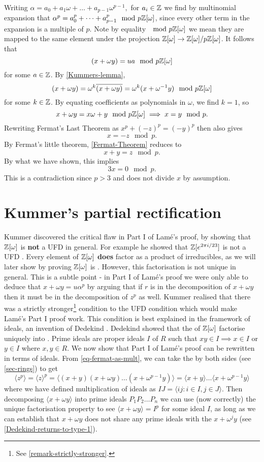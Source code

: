 Writing $\alpha=a_0+a_1\omega+\dots+a_{p-1}\omega^{p-1},$ for $a_i\in \mathbb{Z}$ we find by multinomial expansion that $\alpha^p=a_0^p+\dots+a_{p-1}^p \mod p\mathbb{Z}[\omega]$, since every other term in the expansion is a multiple of $p$. Note by equality    $\mod p\mathbb{Z}[\omega]$ we mean they are mapped to the same element under the projection $\mathbb{Z}[\omega]\rightarrow \mathbb{Z}[\omega]/p\mathbb{Z}[\omega]$. It follows that $$(x+\omega y)=ua\mod p\mathbb{Z}[\omega]$$ for some $a\in \mathbb{Z}$. By \cref{Kummers-lemma}, $$(x+\omega y)=\omega^k\overline{(x+\omega y)}=\omega^k(x+\omega^{-1}y) \mod p\mathbb{Z}[\omega]$$ for some $k\in \mathbb{Z}$. By equating coefficients as polynomials in $\omega$, we find $k=1$, so
$$x+\omega y=x\omega+y \mod p\mathbb{Z}[\omega] \implies x=y\mod p.$$
Rewriting Fermat's Last Theorem as $x^p+(-z)^p=(-y)^p$ then also gives $$x=-z\mod p.$$ By Fermat's little theorem, \cref{Fermat-Theorem} reduces to
$$x+y=z\mod p.$$
By what we have shown, this implies
$$3x=0\mod p.$$
This is a contradiction since $p> 3$ and does not divide $x$ by assumption.

\section{Kummer's partial rectification}
Kummer discovered the critical flaw in Part I of Lamé's proof, by showing that $\mathbb{Z}[\omega]$ is \textbf{not} a UFD in general. For example he showed that $\mathbb{Z}[e^{2\pi i/23}]$ is not a UFD \cite{Wright}. Every element of $\mathbb{Z}[\omega]$ \textbf{does} factor as a product of irreducibles, as we will later show by proving $\mathbb{Z}[\omega]$ is . However, this factorisation is not unique in general. This is a subtle point - in Part I of Lamé's proof we were only able to deduce that $x+\omega y=u\alpha^p$ by arguing that if $r$ is in the decomposition of $x+\omega y$ then it must be in the decomposition of $z^p$ as well. Kummer realised that there was a strictly stronger\footnote{See \cref{remark-strictly-stronger}.} condition to the UFD condition which would make Lamé's Part I proof work. This condition is best explained in the framework of ideals, an invention of Dedekind \cite{Wright}. Dedekind showed that the  of $\mathbb{Z}[\omega]$ factorise uniquely into . Prime ideals are proper ideals $I$ of $R$ such that $xy\in I\implies x\in I$ or $y\in I$ where $x,y\in R.$ We now show that Part I of Lamé's proof can be rewritten in terms of ideals. From \cref{eq-fermat-as-mult}, we can take the  by both sides (see \cref{sec-rings}) to get
\begin{equation} \langle z^p\rangle =\langle z\rangle ^p=\langle (x+y)(x+\omega y)\dots(x+\omega^{p-1}y)\rangle=\langle x+y\rangle\dots\langle x+\omega^{p-1}y\rangle
\label{eq-fermat-mult-ideals}
\end{equation}
where we have defined multiplication of ideals as $IJ=\langle ij:i\in I, j\in J\rangle$. Then decomposing $\langle x+\omega y \rangle$ into prime ideals $P_1P_2\dots P_n$ we can use (now correctly) the unique factorisation property to see $\langle x+\omega y\rangle=I^p$ for some ideal $I$, as long as we can establish that $x+\omega y$ does not share any prime ideals with the $x+\omega^j y$ (see \cref{Dedekind-returns-to-type-1}).

